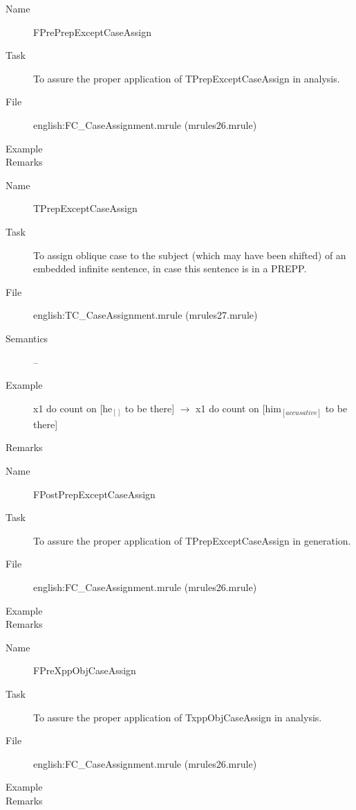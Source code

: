 \begin{description}
\vspace{1 cm}
\begin{description}
\item[Name] FPrePrepExceptCaseAssign
\item[Task] To assure the proper application of TPrepExceptCaseAssign in 
analysis.
\item[File] english:FC\_CaseAssignment.mrule (mrules26.mrule)
\item[Example] 
\item[Remarks]
\end{description}

\vspace{1 cm}
\begin{description}
\item[Name] TPrepExceptCaseAssign
\item[Task] To assign oblique case to the subject (which may have been shifted) 
of an embedded infinite sentence, in case this sentence is in a PREPP.
\item[File] english:TC\_CaseAssignment.mrule (mrules27.mrule)
\item[Semantics] -- 
\item[Example] x1 do count on [he$_{[]}$ to be there] $\rightarrow$ 
x1 do count on [him$_{[accusative]}$ to be there]
\item[Remarks]
\end{description}

\vspace{1 cm}
\begin{description}
\item[Name] FPostPrepExceptCaseAssign
\item[Task] To assure the proper application of TPrepExceptCaseAssign in 
generation.
\item[File] english:FC\_CaseAssignment.mrule (mrules26.mrule)
\item[Example] 
\item[Remarks]
\end{description}

\vspace{1 cm}
\begin{description}
\item[Name] FPreXppObjCaseAssign
\item[Task] To assure the proper application of TxppObjCaseAssign in analysis.
\item[File] english:FC\_CaseAssignment.mrule (mrules26.mrule)
\item[Example] 
\item[Remarks]
\end{description}


\end{description}

